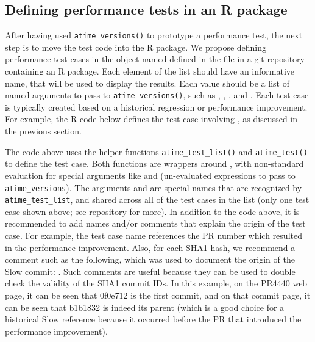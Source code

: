 \subsection{Defining performance tests in an R package}
After having used \verb|atime_versions()| to prototype a performance test, the next step is to move the test code into the R package. 
We propose defining performance test cases in the object named  defined in the  file in a git repository  containing an R package.
Each element of the list should have an informative name, that will be used to display the results.
Each value should be a list of named arguments to pass to \verb|atime_versions()|, such as , , , and  .
Each test case is typically created based on a historical regression or performance improvement. 
For example, the R code below defines the test case involving , as discussed in the previous section.
\begin{Schunk}
\end{Schunk}
The code above uses the helper functions \verb|atime_test_list()| and \verb|atime_test()| to define the test case.
Both functions are wrappers around , with non-standard evaluation for special arguments like  and  (un-evaluated expressions to pass to \verb|atime_versions|). 
The arguments  and  are special names that are recognized by \verb|atime_test_list|, and shared across all of the test cases in the list (only one test case shown above; see  repository for more).
In addition to the code above, it is recommended to add names and/or comments that explain the origin of the test case.
For example, the test case name  references the PR number which resulted in the performance improvement.
Also, for each SHA1 hash, we recommend a comment such as the following, which was used to document the origin of the Slow commit:
.
Such comments are useful because they can be used to double check the validity of the SHA1 commit IDs.
In this example, on the PR4440 web page, it can be seen that 0f0e712 is the first commit, and on that commit page, it can be seen that b1b1832 is indeed its parent (which is a good choice for a historical Slow reference because it occurred before the PR that introduced the performance improvement).

